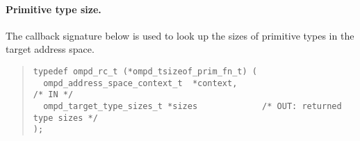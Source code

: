 

\paragraph{Primitive type size.}
The callback signature below is used to look up the sizes
of primitive types in the target address space.
\begin{quote}
\begin{lstlisting}
typedef ompd_rc_t (*ompd_tsizeof_prim_fn_t) (
  ompd_address_space_context_t  *context,                           /* IN */
  ompd_target_type_sizes_t *sizes             /* OUT: returned type sizes */
);
\end{lstlisting}
\end{quote}

